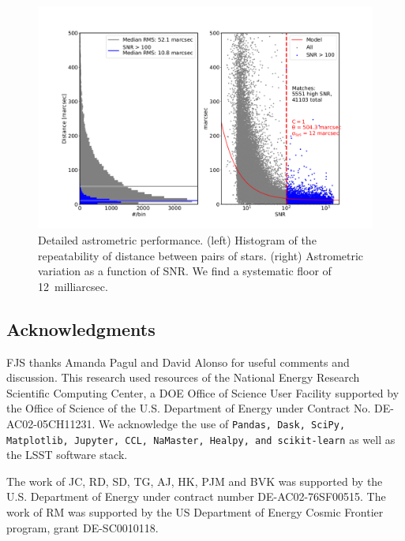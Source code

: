 \documentclass[twocolumn]{aastex62}
\begin{document}
\begin{figure}
\centering
\includegraphics[width=0.9\columnwidth]{DC1-imsim-dithered_r_check_astrometry.png}
\caption{
Detailed astrometric performance.  (left) Histogram of the repeatability of distance between pairs of stars.  (right) Astrometric variation as a function of SNR.  We find a systematic floor of 12~milliarcsec.
}
\label{fig:validate_drp_check_astrometry}
\end{figure}



\subsection*{Acknowledgments}

FJS thanks Amanda Pagul and David Alonso for useful comments and discussion. This research used resources of the National Energy Research Scientific Computing Center, a DOE Office of Science User Facility supported by the Office of Science of the U.S. Department of Energy under Contract No. DE-AC02-05CH11231. We acknowledge the use of \texttt{Pandas, Dask, SciPy, Matplotlib, Jupyter, CCL, NaMaster, Healpy, and scikit-learn} as well as the LSST software stack.

The work of JC, RD, SD, TG, AJ, HK, PJM and BVK was supported by the U.S. Department of Energy under contract number DE-AC02-76SF00515. 
The work of RM was supported by the US Department of Energy Cosmic Frontier program, grant DE-SC0010118.




\end{document}
